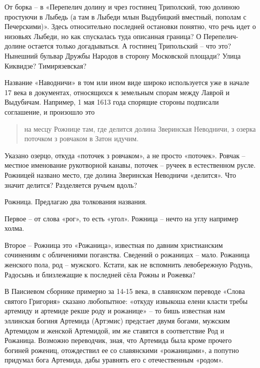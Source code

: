 
От борка – в «Перепелич долину и чрез гостинец Триполский, тою долиною простуючи в Лыбедь (а там в Лыбеди млын Выдубицкий вместный, пополам с Печерскими)». Здесь относительно последней остановки понятно, что речь идет о низовьях Лыбеди, но как спускалась туда описанная граница? О Перепелич-долине остается только догадываться. А гостинец Трипольский – что это? Нынешний бульвар Дружбы Народов в сторону Московской площади? Улица Киквидзе? Тимирязевская?

Название «Наводничи» в том или ином виде широко используется уже в начале 17 века в документах, относящихся к земельным спорам между Лаврой и Выдубичам. Например, 1 мая 1613 года спорящие стороны подписали соглашение, и произошло это

\begin{quotation}
на месцу Рожнице там, где делится долина Зверинская Неводничи, з озерка поточком з ровчаком в Затон идучим.
\end{quotation} 

Указано озерцо, откуда «поточек з ровчаком», а не просто «поточек». Ровчак – местное именование рукотворной канавы, поточек – ручеек в естественном русле. Рожницей названо место, где долина Зверинская Неводничи «делится». Что значит делится? Разделяется ручьем вдоль?

Рожница. Предлагаю два толкования названия.

Первое – от слова «рог», то есть «угол». Рожница – нечто на углу например холма.

Второе – Рожница это «Рожаница», известная по давним христианским сочинениям с обличениями поганства. Сведений о рожаницах – мало. Рожаница женского пола, род – мужского. Кстати, как не вспомнить левобережную Родунь, Радосынь и близлежащие к последней сёла Рожны и Рожевка?

В Паисиевом сборнике примерно за 14-15 века, в славянском переводе «Слова святого Григория» сказано любопытное: «откуду извыкоша елени класти требы артемиду и артемиде рекше роду и рожанице» – то бишь известная нам эллинская богиня Артемида (Артэмис) предстает двумя богами, мужским Артемидом и женской Артемидой, им же ставятся в соответствие Род и Рожаница. Возможно переводчик, зная, что Артемида была кроме прочего богиней рожениц, отождествил ее со славянскими «рожаницами», а попутно придумал бога Артемида, дабы уравнять его с отечественным «родом».

